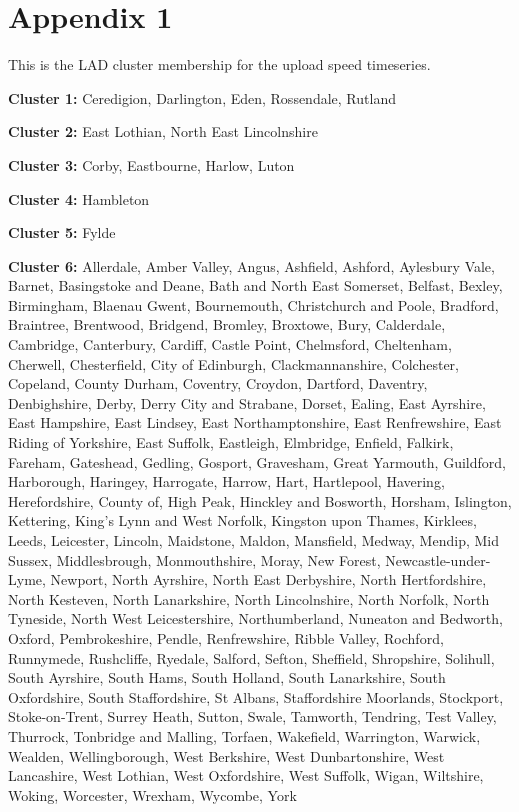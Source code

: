 \documentclass[Royal,times,sageh]{sagej}
\begin{document}
\pagebreak

\hypertarget{appendix1}{%
\section{Appendix 1}\label{appendix1}}

This is the LAD cluster membership for the upload speed timeseries.

\textbf{Cluster 1: } Ceredigion, Darlington, Eden, Rossendale, Rutland

\textbf{Cluster 2: } East Lothian, North East Lincolnshire

\textbf{Cluster 3: } Corby, Eastbourne, Harlow, Luton

\textbf{Cluster 4: } Hambleton

\textbf{Cluster 5: } Fylde

\textbf{Cluster 6: } Allerdale, Amber Valley, Angus, Ashfield, Ashford,
Aylesbury Vale, Barnet, Basingstoke and Deane, Bath and North East
Somerset, Belfast, Bexley, Birmingham, Blaenau Gwent, Bournemouth,
Christchurch and Poole, Bradford, Braintree, Brentwood, Bridgend,
Bromley, Broxtowe, Bury, Calderdale, Cambridge, Canterbury, Cardiff,
Castle Point, Chelmsford, Cheltenham, Cherwell, Chesterfield, City of
Edinburgh, Clackmannanshire, Colchester, Copeland, County Durham,
Coventry, Croydon, Dartford, Daventry, Denbighshire, Derby, Derry City
and Strabane, Dorset, Ealing, East Ayrshire, East Hampshire, East
Lindsey, East Northamptonshire, East Renfrewshire, East Riding of
Yorkshire, East Suffolk, Eastleigh, Elmbridge, Enfield, Falkirk,
Fareham, Gateshead, Gedling, Gosport, Gravesham, Great Yarmouth,
Guildford, Harborough, Haringey, Harrogate, Harrow, Hart, Hartlepool,
Havering, Herefordshire, County of, High Peak, Hinckley and Bosworth,
Horsham, Islington, Kettering, King's Lynn and West Norfolk, Kingston
upon Thames, Kirklees, Leeds, Leicester, Lincoln, Maidstone, Maldon,
Mansfield, Medway, Mendip, Mid Sussex, Middlesbrough, Monmouthshire,
Moray, New Forest, Newcastle-under-Lyme, Newport, North Ayrshire, North
East Derbyshire, North Hertfordshire, North Kesteven, North Lanarkshire,
North Lincolnshire, North Norfolk, North Tyneside, North West
Leicestershire, Northumberland, Nuneaton and Bedworth, Oxford,
Pembrokeshire, Pendle, Renfrewshire, Ribble Valley, Rochford, Runnymede,
Rushcliffe, Ryedale, Salford, Sefton, Sheffield, Shropshire, Solihull,
South Ayrshire, South Hams, South Holland, South Lanarkshire, South
Oxfordshire, South Staffordshire, St Albans, Staffordshire Moorlands,
Stockport, Stoke-on-Trent, Surrey Heath, Sutton, Swale, Tamworth,
Tendring, Test Valley, Thurrock, Tonbridge and Malling, Torfaen,
Wakefield, Warrington, Warwick, Wealden, Wellingborough, West Berkshire,
West Dunbartonshire, West Lancashire, West Lothian, West Oxfordshire,
West Suffolk, Wigan, Wiltshire, Woking, Worcester, Wrexham, Wycombe,
York
\end{document}
